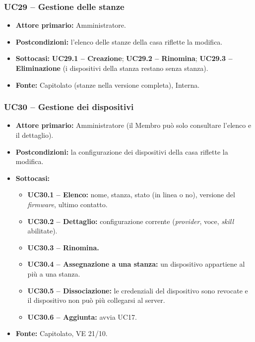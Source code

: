 \documentclass[12pt,a4paper]{article}
\newcommand{\tightlist}{\setlength{\itemsep}{1pt}\setlength{\parskip}{0pt}}
\begin{document}
\subsubsection{UC29 -- Gestione delle stanze}
\begin{itemize}
\tightlist
\item \textbf{Attore primario:} Amministratore.
\item \textbf{Postcondizioni:} l'elenco delle stanze della casa riflette la modifica.
\item \textbf{Sottocasi:} \textbf{UC29.1 -- Creazione}; \textbf{UC29.2 -- Rinomina}; \textbf{UC29.3 -- Eliminazione} (i dispositivi della stanza restano senza stanza).
\item \textbf{Fonte:} Capitolato (stanze nella versione completa), Interna.
\end{itemize}

\subsubsection{UC30 -- Gestione dei dispositivi}
\begin{itemize}
\tightlist
\item \textbf{Attore primario:} Amministratore (il Membro può solo consultare l'elenco e il dettaglio).
\item \textbf{Postcondizioni:} la configurazione dei dispositivi della casa riflette la modifica.
\item \textbf{Sottocasi:}
\begin{itemize}
\tightlist
\item \textbf{UC30.1 -- Elenco:} nome, stanza, stato (in linea o no), versione del \emph{firmware}, ultimo contatto.
\item \textbf{UC30.2 -- Dettaglio:} configurazione corrente (\emph{provider}, voce, \emph{skill} abilitate).
\item \textbf{UC30.3 -- Rinomina.}
\item \textbf{UC30.4 -- Assegnazione a una stanza:} un dispositivo appartiene al più a una stanza.
\item \textbf{UC30.5 -- Dissociazione:} le credenziali del dispositivo sono revocate e il dispositivo non può più collegarsi al server.
\item \textbf{UC30.6 -- Aggiunta:} avvia UC17.
\end{itemize}
\item \textbf{Fonte:} Capitolato, VE 21/10.
\end{itemize}
\end{document}
